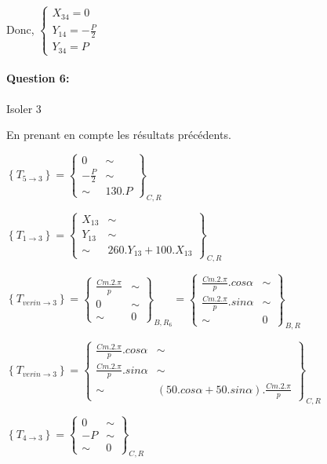 Donc, $\left\{\begin{array}{l}
X_{34}=0 \\
Y_{14}=-\frac{P}{2} \\
Y_{34}=P
\end{array}\right.$

\paragraph{Question 6:}

Isoler 3

En prenant en compte les résultats précédents.

$\left\{T_{5\rightarrow 3}\right\}=\left\{
\begin{array}{cc}
0 & \sim \\
-\frac{P}{2} & \sim \\
\sim & 130.P
\end{array}
\right\}_{C,R}$

$\left\{T_{1\rightarrow 3}\right\}=\left\{
\begin{array}{cc}
X_{13} & \sim \\
Y_{13} & \sim \\
\sim & 260.Y_{13}+100.X_{13}
\end{array}
\right\}_{C,R}$

$\left\{T_{verin \rightarrow 3}\right\}=\left\{
\begin{array}{cc}
\frac{Cm.2.\pi}{p} & \sim \\
0 & \sim \\
\sim & 0
\end{array}
\right\}_{B,R_6}=\left\{
\begin{array}{cc}
\frac{Cm.2.\pi}{p}.cos\alpha & \sim \\
\frac{Cm.2.\pi}{p}.sin\alpha & \sim \\
\sim & 0
\end{array}
\right\}_{B,R}$

$\left\{T_{verin \rightarrow 3}\right\}=\left\{
\begin{array}{cc}
\frac{Cm.2.\pi}{p}.cos\alpha & \sim \\
\frac{Cm.2.\pi}{p}.sin\alpha & \sim \\
\sim & (50.cos\alpha+50.sin\alpha).\frac{Cm.2.\pi}{p}
\end{array}
\right\}_{C,R}$

$\left\{T_{4\rightarrow 3}\right\}=\left\{
\begin{array}{cc}
0 & \sim \\
-P & \sim \\
\sim & 0
\end{array}
\right\}_{C,R}$

